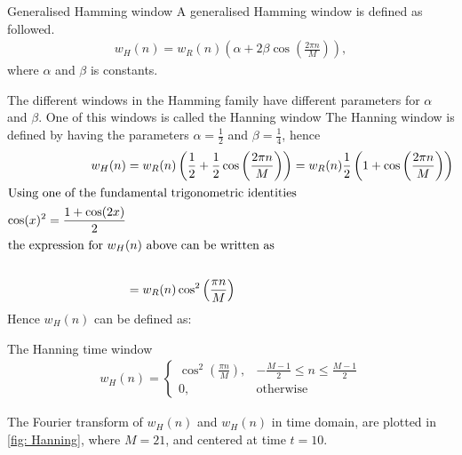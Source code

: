 \begin{definition}{Generalised Hamming window}
A generalised Hamming window is defined as followed.
\begin{align*}
    w_H(n)=w_R(n) \left(\alpha +2\beta \cos\left(\frac{2\pi n}{M}\right)\right),
\end{align*}
where $\alpha$ and $\beta$ is constants. 
\end{definition}

The different windows in the Hamming family have different parameters for $\alpha$ and $\beta$. 
One of this windows is called the Hanning window
The Hanning window is defined by having the parameters $\alpha = \frac{1}{2} $ and $\beta = \frac{1}{4}$, hence
\begin{align*}
    w_H(n)&=w_R(n) \left(\frac{1}{2} + \frac{1}{2} \cos\left(\frac{2\pi n}{M}\right)\right) = w_R(n) \frac{1}{2}\left(1+\cos\left(\frac{2\pi n}{M}\right)\right)\\
    \intertext{Using one of the fundamental trigonometric identities} \cos(x)^2=\frac{1+\cos(2x)}{2}\\
    \intertext{the expression for $w_H(n)$ above can be written as}\\
    &=w_R(n)\cos^2\left(\frac{\pi n}{M}\right)
\end{align*}
Hence $w_H(n)$ can be defined as:
\begin{definition}{The Hanning time window}
   \begin{align*}
        w_H(n)=
    \begin{cases}
    \cos^2\left(\frac{\pi n}{M}\right), & -\frac{M-1}{2}\leq n \leq \frac{M-1}{2} \\
    0, & \text{otherwise}
    \end{cases}   
   \end{align*}
\end{definition}
The Fourier transform of $w_H(n)$ and $w_H(n)$ in time domain, are plotted in \autoref{fig: Hanning}, where $M=21$, and centered at time $t=10$.
